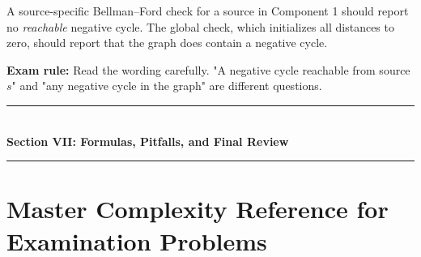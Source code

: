 A source-specific Bellman--Ford check for a source in Component 1 should report no \textit{reachable} negative cycle. The global check, which initializes all distances to zero, should report that the graph does contain a negative cycle.

\textbf{Exam rule:} Read the wording carefully. "A negative cycle reachable from source $s$" and "any negative cycle in the graph" are different questions.


\newpage
\begin{center}
\vspace{0.5em}
{\color{primary}\rule{0.45\textwidth}{1.2pt}}\\[4pt]
{\Large\bfseries\color{primary} Section VII: Formulas, Pitfalls, and Final Review}\\[2pt]
{\color{primary}\rule{0.45\textwidth}{1.2pt}}
\vspace{0.5em}
\end{center}

\section{Master Complexity Reference for Examination Problems}


